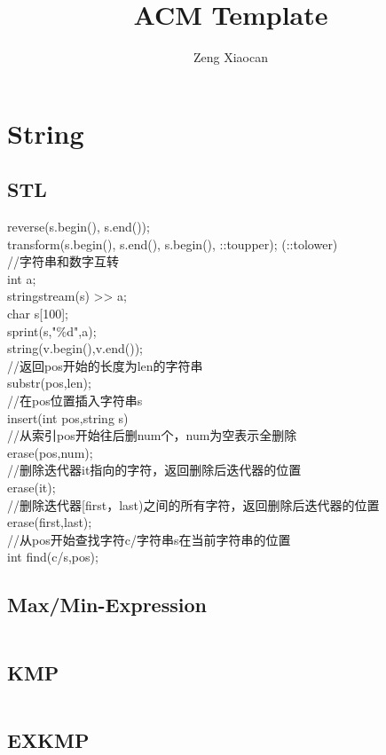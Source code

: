\documentclass[a4paper,12pt]{article}
\author{Zeng Xiaocan}
\title{ACM Template}
\begin{document}
 
\maketitle %
\newpage %
\tableofcontents %
\newpage
\section{String}
\subsection{STL}
\begin{framed}
	\noindent reverse(s.begin(), s.end());
	\\ transform(s.begin(), s.end(), s.begin(), ::toupper);  (::tolower)
	\\ //字符串和数字互转
	\\ int a;
	\\ stringstream(s) >> a;
	\\ char s[100];
	\\ sprint(s,"\%d",a);
	\\ string(v.begin(),v.end());
	\\ //返回pos开始的长度为len的字符串
	\\ substr(pos,len);
	\\ //在pos位置插入字符串s
	\\ insert(int pos,string s)
	\\ //从索引pos开始往后删num个，num为空表示全删除
	\\ erase(pos,num);
	\\ //删除迭代器it指向的字符，返回删除后迭代器的位置
	\\ erase(it);
	\\ //删除迭代器[first，last)之间的所有字符，返回删除后迭代器的位置
	\\ erase(first,last);
	\\ //从pos开始查找字符c/字符串s在当前字符串的位置
	\\ int find(c/s,pos);
\end{framed}
\subsection{Max/Min-Expression}
\inputminted[]{c++}{Template/String/express.cpp}
\subsection{KMP}
\inputminted[]{c++}{Template/String/kmp.cpp}
\subsection{EXKMP}
\inputminted[]{c++}{Template/String/exkmp.cpp}
\end{document}
